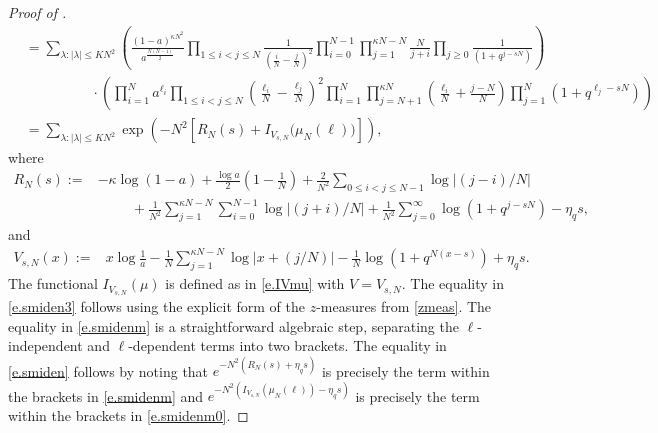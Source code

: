 \documentclass[reqno,11pt]{amsart}
\newcommand{\logq}{\eta_q}
\numberwithin{equation}{section}
\theoremstyle{definition}
\begin{document}
\begin{proof}[Proof of ]
\begin{align}
   & \label{e.smidenm} =\sum_{\lambda : |\lambda|\le KN^2}
   \left(\frac{(1-a)^{\kappa N^2}}{ a^{\frac{N(N-1)}{2}}}\prod_{1\leq i<j\leq N}\frac{1}{(\frac{i}{N}-\frac{j}{N})^{2}}\prod_{i=0}^{N-1}\prod_{j=1}^{\kappa N-N}\frac{N}{j+i}\prod_{j\geq 0}\frac{1}{(1+q^{j-sN})}\right)\\ \label{e.smidenm0}
   &\hspace{2cm} \cdot \left(\prod_{i=1}^N a^{\ell_i}\prod_{1\leq i<j\leq N}\left(\frac{\ell_i}{N}-\frac{\ell_j}{N}\right)^2\prod_{i=1}^N\prod_{j=N+1}^{\kappa N} \left(\frac{\ell_i}{N}+\frac{j-N}{N}\right)\prod_{j=1}^N(1+q^{\ell_j-sN})\right)
   \\ & = \sum_{\lambda : |\lambda|\le KN^2} \exp\left(- N^2 [R_N(s)+I_{V_{s,N}}\big(\mu_N(\ell)\big)]\right), \label{e.smiden}
\end{align}
  where
\begin{equation}
\label{defrn}
\begin{aligned}
    R_N(s):=& -\kappa \log(1-a)+\frac{\log a}{2}\left(1-\frac{1}{N}\right) +\frac{2}{ N^2}\sum_{0\leq i<j\leq N-1}\log|(j-i)/N| \\
    &\hspace{1cm}+\frac{1}{ N^2}\sum_{j=1}^{\kappa N-N}\sum_{i=0}^{N-1} \log|(j+i)/N|+\frac{1}{ N^2}\sum_{j=0}^{\infty}\log(1+q^{j-sN})-\logq s,
\end{aligned}
\end{equation}
and 
\begin{equation*}
\begin{aligned}
    V_{s,N}(x):= &x\log\frac1a -\frac{1}{ N}\sum_{j=1}^{\kappa N-N} \log|x+(j/N)|-\frac{1}{ N}\log(1+q^{N(x-s)})+ \logq s.
\end{aligned}
\end{equation*}
The functional $I_{V_{s,N}}(\mu)$ is defined as in \eqref{e.IVmu} with $V=V_{s,N}$. 
The equality in \eqref{e.smiden3} follows using the explicit form of the $z$-measures from \eqref{zmeas}.
The equality in \eqref{e.smidenm} is a straightforward algebraic step, separating the $\ell$-independent and $\ell$-dependent terms into two brackets. The equality in \eqref{e.smiden} follows by noting that $e^{-N^2(R_N(s)+\logq s)}$ is precisely the term within the brackets in \eqref{e.smidenm} and $e^{-N^2(I_{V_{s,N}}(\mu_N(\ell))-\logq s)}$ is precisely the term within the brackets in \eqref{e.smidenm0}.



\end{proof}
\end{document}
